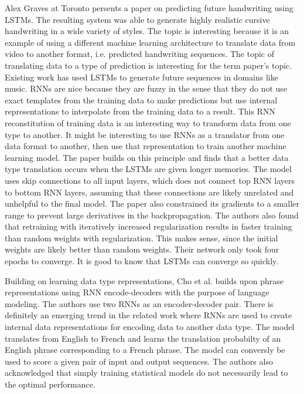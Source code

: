 Alex Graves at Toronto persents a paper on predicting future handwriting using LSTMs.  The resulting system was able to generate highly realistic cursive handwriting in a wide variety of styles.  The topic is interesting because it is an example of using a different machine learning architecture to translate data from video to another format, i.e. predicted handwriting sequences.  The topic of translating data to a type of prediction is interesting for the term paper's topic.  Existing work has used LSTMs to generate future sequences in domains like music.  RNNs are nice because they are fuzzy in the sense that they do not use exact templates from the training data to make predictions but use internal representations to interpolate from the training data to a result.  This RNN reconstitution of training data is an interesting way to transform data from one type to another.  It might be interesting to use RNNs as a translator from one data format to another, then use that representation to train another machine learning model.  The paper builds on this principle and finds that a better data type translation occurs when the LSTMs are given longer memories.  The model uses skip connections to all input layers, which does not connect top RNN layers to bottom RNN layers, assuming that these connections are likely unrelated and unhelpful to the final model.  The paper also constrained its gradients to a smaller range to prevent large derivatives in the backpropagation.  The authors also found that retraining with iteratively increased regularization results in faster training than random weights with regularization.  This makes sense, since the initial weights are likely better than random weights.  Their network only took four epochs to converge.  It is good to know that LSTMs can converge so quickly.

Building on learning data type representations, Cho et al. builds upon phrase representations using RNN encode-decoders with the purpose of language modeling.  The authors use two RNNs as an encoder-decoder pair.  There is definitely an emerging trend in the related work where RNNs are used to create internal data representations for encoding data to another data type.  The model translates from English to French and learns the translation probabilty of an English phrase corresponding to a French phrase.  The model can conversly be used to score a given pair of input and output sequences. The authors also acknowledged that simply training statistical models do not necessarily lead to the optimal performance.

